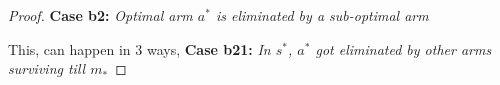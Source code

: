 \begin{proof}
 
\textbf{Case b2:} \textit{Optimal arm $a^{*}$ is eliminated by a sub-optimal arm}
  
	This, can happen in $3$ ways,
\newline
\textbf{Case b21:} \textit{In $s^{*}$, $a^{*}$ got eliminated by other arms surviving till $m_{*}$} 


\end{proof}
